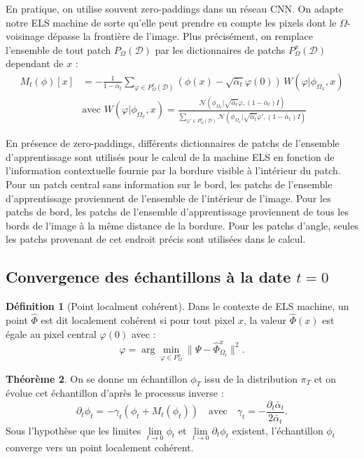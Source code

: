 \documentclass[a4paper,10pt]{article}
\theoremstyle{definition} %
\newtheorem{definition}{Définition}[section]
\theoremstyle{definition} %
\theoremstyle{definition} %
\newtheorem{theorem}[definition]{Théorème}
\theoremstyle{definition} %
\begin{document}
En pratique, on utilise souvent zero-paddings dans un réseau CNN. On adapte notre ELS machine de sorte qu'elle peut prendre en compte les pixels dont le $\Omega$-voisinage dépasse la frontière de l'image. Plus précisément, on remplace l'ensemble de tout patch $P_\Omega(\mathcal{D})$ par les dictionnaires de patchs $P_\Omega^x(\mathcal{D})$ dependant de $x$ :
\begin{align*}
    M_t(\phi)[x] &=  -\frac{1}{1 - \bar \alpha_t}\sum\limits_{\varphi \in P_\Omega^x(\mathcal{D})}  \left(\phi(x) - \sqrt{\bar \alpha_t} \varphi(0)\right)\, W(\varphi | \phi_{\Omega_x},x)\\
    & \text{avec } W(\varphi | \phi_{\Omega_x},x) = \frac{\mathcal{N} (\phi_{\Omega_x} | \sqrt{\bar \alpha_t} \varphi, (1 - \bar \alpha_t) I)}
    {\sum\limits_{\varphi' \in P_\Omega^x(\mathcal{D})} \mathcal{N} (\phi_{\Omega_x} | \sqrt{\bar \alpha_t} \varphi', (1 - \bar \alpha_t) I)}
\end{align*}

En présence de zero-paddings, différents dictionnaires de patchs de l'ensemble d'apprentissage sont utilisés pour le calcul de la machine ELS en fonction de l'information contextuelle fournie par la bordure visible à l'intérieur du patch. Pour un patch central sans information sur le bord, les patchs de l'ensemble d'apprentissage proviennent de l'ensemble de l'intérieur de l'image. Pour les patchs de bord, les patchs de l'ensemble d'apprentissage proviennent de tous les bords de l'image à la même distance de la bordure. Pour les patchs d'angle, seules les patchs provenant de cet endroit précis sont utilisées dans le calcul.

\subsection{Convergence des échantillons à la date $t = 0$}
\begin{definition}[Point localment cohérent]
    Dans le contexte de ELS machine, un point \(\hat{\Phi}\) est dit localement cohérent si 
    pour tout pixel \( x \), la valeur \(\hat{\Phi}(x)\) est égale au pixel central \( \varphi(0) \) avec :
\[
    \varphi = \arg \min_{\varphi \in P_{\Omega}^{x}} \|\Psi - \hat{\Phi}_{\Omega_t}^{x}\|^2.
\]
\end{definition}


\begin{theorem}
    On se donne un échantillon \(\phi_T\) issu de la distribution \(\pi_T\) et on évolue cet échantillon d'après le processus inverse :
    \[
    \partial_t \phi_t = - \gamma_t \left( \phi_t + M_t(\phi_t) \right) \quad \text{avec} \quad \gamma_t = -\frac{\partial_t \bar{\alpha}_t}{2 \bar \alpha_t}.
    \]
    Sous l’hypothèse que les limites \( \lim\limits_{t \to 0} \phi_t \) et \( \lim\limits_{t \to 0} \partial_t \phi_t \) existent, l’échantillon \( \phi_t \) converge vers un point localement cohérent.
\end{theorem}
\end{document}
